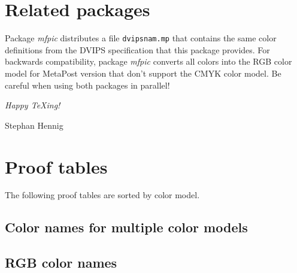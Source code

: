 \documentclass[DIV=9, captions=tableheading]{scrartcl}
\newcommand*{\cmd}[1]{\texttt{#1}}
\newcommand*{\name}[1]{\textsf{\mdseries\emph{#1}}}
\newcommand*{\colorproof}[2][]{%
  \texttt{[image: proof-spec-\#1-\#2.mps]}%
  \hspace{5pt}%
  \nolinkurl{#2}%
}
\begin{document}
\section{Related packages}
\label{sec:relatedpkg}
Package \name{mfpic} distributes a file \cmd{dvipsnam.mp} that contains
the same color definitions from the DVIPS specification that this
package provides.  For backwards compatibility, package \name{mfpic}
converts all colors into the RGB color model for MetaPost version that
don't support the CMYK color model.  Be careful when using both packages
in parallel!

\begin{flushleft}
  \itshape%
  Happy \TeX ing!\par
  Stephan Hennig
\end{flushleft}


\appendix
\section{Proof tables}
\label{sec:prooftables}
The following proof tables are sorted by color model.


\clearpage
\setlength{\columnsep}{3pt}

\subsection{Color names for multiple color models}
\label{sec:multinames}

\newlength{\tabcolwidth}
\begingroup
\renewcommand*{\colorproof}[2][]{%
  \texttt{[image: proof-spec-\#1-rgb\_\#2.mps]}%
  \hspace{5pt}%
  \nolinkurl{rgb_#2}%
  & \texttt{[image: proof-spec-\#1-cmyk\_\#2.mps]}%
  \hspace{5pt}%
  \nolinkurl{cmyk_#2}%
  & \texttt{[image: proof-spec-\#1-grey\_\#2.mps]}%
  \hspace{5pt}%
  \nolinkurl{grey_#2}%
}

\endgroup

\clearpage
\subsection{RGB color names}
\label{sec:rgbnames}




\end{document}
